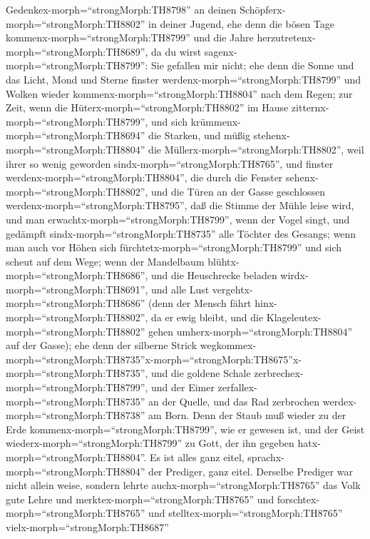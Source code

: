  Gedenkex-morph=``strongMorph:TH8798'' an deinen
Schöpferx-morph=``strongMorph:TH8802'' in deiner Jugend, ehe denn die
bösen Tage kommenx-morph=``strongMorph:TH8799'' und die Jahre
herzutretenx-morph=``strongMorph:TH8689'', da du wirst
sagenx-morph=``strongMorph:TH8799'': Sie gefallen mir nicht;
 ehe denn die Sonne und das Licht, Mond und Sterne finster
werdenx-morph=``strongMorph:TH8799'' und Wolken wieder
kommenx-morph=``strongMorph:TH8804'' nach dem Regen;  zur
Zeit, wenn die Hüterx-morph=``strongMorph:TH8802'' im Hause
zitternx-morph=``strongMorph:TH8799'', und sich
krümmenx-morph=``strongMorph:TH8694'' die Starken, und müßig
stehenx-morph=``strongMorph:TH8804'' die
Müllerx-morph=``strongMorph:TH8802'', weil ihrer so wenig geworden
sindx-morph=``strongMorph:TH8765'', und finster
werdenx-morph=``strongMorph:TH8804'', die durch die Fenster
sehenx-morph=``strongMorph:TH8802'',  und die Türen an der
Gasse geschlossen werdenx-morph=``strongMorph:TH8795'', daß die Stimme
der Mühle leise wird, und man erwachtx-morph=``strongMorph:TH8799'',
wenn der Vogel singt, und gedämpft sindx-morph=``strongMorph:TH8735''
alle Töchter des Gesangs;  wenn man auch vor Höhen sich
fürchtetx-morph=``strongMorph:TH8799'' und sich scheut auf dem Wege;
wenn der Mandelbaum blühtx-morph=``strongMorph:TH8686'', und die
Heuschrecke beladen wirdx-morph=``strongMorph:TH8691'', und alle Lust
vergehtx-morph=``strongMorph:TH8686'' (denn der Mensch fährt
hinx-morph=``strongMorph:TH8802'', da er ewig bleibt, und die
Klageleutex-morph=``strongMorph:TH8802'' gehen
umherx-morph=``strongMorph:TH8804'' auf der Gasse);  ehe
denn der silberne Strick
wegkommex-morph=``strongMorph:TH8735''\textbar x-morph=``strongMorph:TH8675''x-morph=``strongMorph:TH8735'',
und die goldene Schale zerbrechex-morph=``strongMorph:TH8799'', und der
Eimer zerfallex-morph=``strongMorph:TH8735'' an der Quelle, und das Rad
zerbrochen werdex-morph=``strongMorph:TH8738'' am Born. 
Denn der Staub muß wieder zu der Erde
kommenx-morph=``strongMorph:TH8799'', wie er gewesen ist, und der Geist
wiederx-morph=``strongMorph:TH8799'' zu Gott, der ihn gegeben
hatx-morph=``strongMorph:TH8804''.  Es ist alles ganz eitel,
sprachx-morph=``strongMorph:TH8804'' der Prediger, ganz eitel.
 Derselbe Prediger war nicht allein weise, sondern lehrte
auchx-morph=``strongMorph:TH8765'' das Volk gute Lehre und
merktex-morph=``strongMorph:TH8765'' und
forschtex-morph=``strongMorph:TH8765'' und
stelltex-morph=``strongMorph:TH8765'' vielx-morph=``strongMorph:TH8687''
